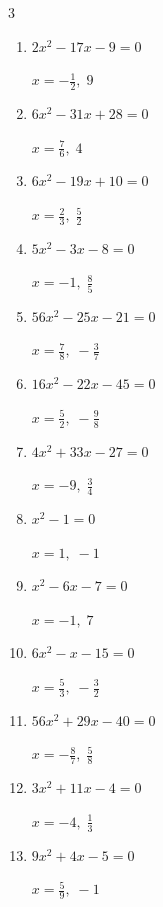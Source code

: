 \begin{multicols}{3}
\begin{enumerate}
        $\displaystyle x=\frac{4}{3},\; \frac{5}{2}$

  \item $2x^{2}-17x-9=0$

        $\displaystyle x=-\frac{1}{2},\; 9$

  \item $6x^{2}-31x+28=0$

        $\displaystyle x=\frac{7}{6},\; 4$

  \item $6x^{2}-19x+10=0$

        $\displaystyle x=\frac{2}{3},\; \frac{5}{2}$

  \item $5x^{2}-3x-8=0$

        $\displaystyle x=-1,\; \frac{8}{5}$

  \item $56x^{2}-25x-21=0$

        $\displaystyle x=\frac{7}{8},\; -\frac{3}{7}$

  \item $16x^{2}-22x-45=0$

        $\displaystyle x=\frac{5}{2},\; -\frac{9}{8}$

  \item $4x^{2}+33x-27=0$

        $\displaystyle x=-9,\; \frac{3}{4}$

  \item $x^{2}-1=0$

        $\displaystyle x=1,\; -1$

  \item $x^{2}-6x-7=0$

        $\displaystyle x=-1,\; 7$

\columnbreak %

  \item $6x^{2}-x-15=0$

        $\displaystyle x=\frac{5}{3},\; -\frac{3}{2}$

  \item $56x^{2}+29x-40=0$

        $\displaystyle x=-\frac{8}{7},\; \frac{5}{8}$

  \item $3x^{2}+11x-4=0$

        $\displaystyle x=-4,\; \frac{1}{3}$

  \item $9x^{2}+4x-5=0$

        $\displaystyle x=\frac{5}{9},\; -1$


\end{enumerate}
\end{multicols}
